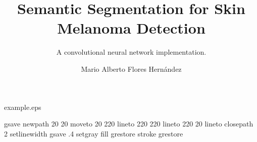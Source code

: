 %
%
%
%
%
\begin{filecontents*}{example.eps}

gsave
newpath
  20 20 moveto
  20 220 lineto
  220 220 lineto
  220 20 lineto
closepath
2 setlinewidth
gsave
  .4 setgray fill
grestore
stroke
grestore
\end{filecontents*}
%
\RequirePackage{fix-cm}
%
\documentclass[twocolumn, draft]{svjour3}          %
%
\smartqed  %
%
\usepackage{graphicx}
\usepackage{blindtext}
\usepackage[utf8]{inputenc}
\usepackage{booktabs}



%
%
%
%


\title{Semantic Segmentation for Skin Melanoma Detection%
}
\subtitle{A convolutional neural network implementation.}


\author{Mario Alberto Flores Hernández}


